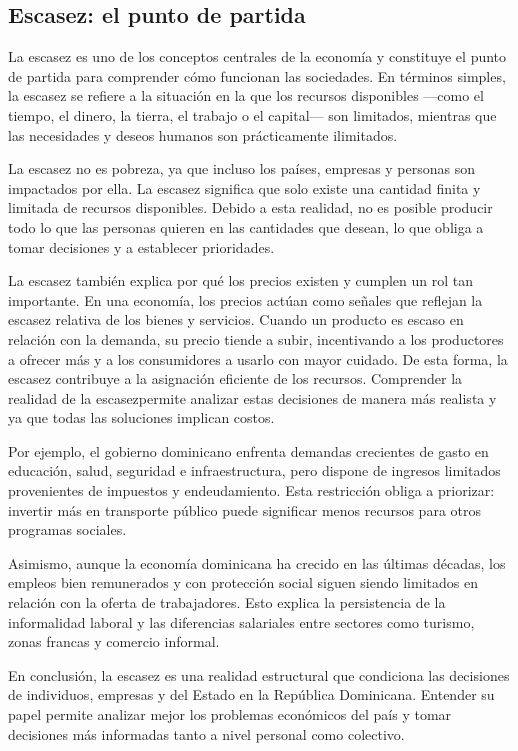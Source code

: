 \documentclass[
  letterpaper,
  DIV=11,
  numbers=noendperiod,
  oneside]{scrreprt}
\begin{document}
\subsection{Escasez: el punto de
partida}\label{escasez-el-punto-de-partida}

La escasez es uno de los conceptos centrales de la economía y constituye
el punto de partida para comprender cómo funcionan las sociedades. En
términos simples, la escasez se refiere a la situación en la que los
recursos disponibles ---como el tiempo, el dinero, la tierra, el trabajo
o el capital--- son limitados, mientras que las necesidades y deseos
humanos son prácticamente ilimitados.

La escasez no es pobreza, ya que incluso los países, empresas y personas
son impactados por ella. La escasez significa que solo existe una
cantidad finita y limitada de recursos disponibles. Debido a esta
realidad, no es posible producir todo lo que las personas quieren en las
cantidades que desean, lo que obliga a tomar decisiones y a establecer
prioridades.

La escasez también explica por qué los precios existen y cumplen un rol
tan importante. En una economía, los precios actúan como señales que
reflejan la escasez relativa de los bienes y servicios. Cuando un
producto es escaso en relación con la demanda, su precio tiende a subir,
incentivando a los productores a ofrecer más y a los consumidores a
usarlo con mayor cuidado. De esta forma, la escasez contribuye a la
asignación eficiente de los recursos. Comprender la realidad de la
escasezpermite analizar estas decisiones de manera más realista y ya que
todas las soluciones implican costos.

Por ejemplo, el gobierno dominicano enfrenta demandas crecientes de
gasto en educación, salud, seguridad e infraestructura, pero dispone de
ingresos limitados provenientes de impuestos y endeudamiento. Esta
restricción obliga a priorizar: invertir más en transporte público puede
significar menos recursos para otros programas sociales.

Asimismo, aunque la economía dominicana ha crecido en las últimas
décadas, los empleos bien remunerados y con protección social siguen
siendo limitados en relación con la oferta de trabajadores. Esto explica
la persistencia de la informalidad laboral y las diferencias salariales
entre sectores como turismo, zonas francas y comercio informal.

En conclusión, la escasez es una realidad estructural que condiciona las
decisiones de individuos, empresas y del Estado en la República
Dominicana. Entender su papel permite analizar mejor los problemas
económicos del país y tomar decisiones más informadas tanto a nivel
personal como colectivo.
\end{document}
